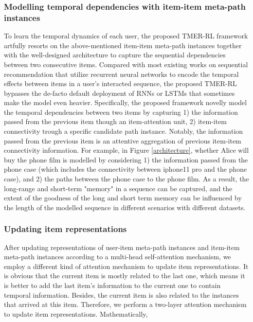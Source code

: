 \subsubsection{\textbf{Modelling temporal dependencies with item-item meta-path instances}}
\label{sec:subsubsec3.4.2}
To learn the temporal dynamics of each user, the proposed TMER-RL framework artfully resorts on the above-mentioned item-item meta-path instances together with the well-designed architecture to capture the sequential dependencies between two consecutive items. Compared with most existing works on sequential recommendation \cite{wang2019explainable, zhu2020knowledge, xu2019recurrent} that utilize recurrent neural networks to encode the temporal effects between items in a user's interacted sequence, the proposed TMER-RL bypasses the de-facto default deployment of RNNs or LSTMs that sometimes make the model even heavier. Specifically, the proposed framework novelly model the temporal dependencies between two items by capturing 1) the information passed from the previous item though an item-attention unit, 2) item-item connectivity trough a specific candidate path instance. Notably, the information passed from the previous item is an attentive aggregation of previous item-item connectivity information. For example, in Figure \ref{architecture}, whether Alice will buy the phone film is modelled by considering 1) the information passed from the phone case (which includes the connectivity between iphone11 pro and the phone case), and 2) the paths between the phone case to the phone film. As a result, the long-range and short-term "memory" in a sequence can be captured, and the extent of the goodness of the long and short term memory can be influenced by the length of the modelled sequence in different scenarios with different datasets. 


\subsubsection{\textbf{Updating item representations}}
After updating representations of user-item meta-path instances and item-item meta-path instances according to a multi-head self-attention mechanism, we employ a different kind of attention mechanism to update item representations. It is obvious that the current item is mostly related to the last one, which means it is better to add the last item's information to the current one to contain temporal information. Besides, the current item is also related to the instances that arrived at this item. Therefore, we perform a two-layer attention mechanism to update item representations. Mathematically,

